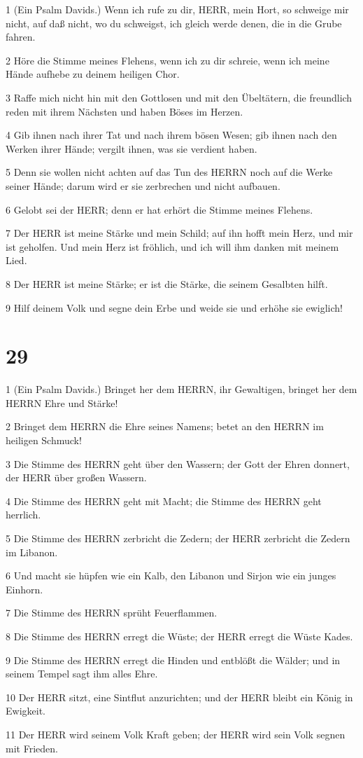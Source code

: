 \par 1 (Ein Psalm Davids.) Wenn ich rufe zu dir, HERR, mein Hort, so schweige mir nicht, auf daß nicht, wo du schweigst, ich gleich werde denen, die in die Grube fahren.
\par 2 Höre die Stimme meines Flehens, wenn ich zu dir schreie, wenn ich meine Hände aufhebe zu deinem heiligen Chor.
\par 3 Raffe mich nicht hin mit den Gottlosen und mit den Übeltätern, die freundlich reden mit ihrem Nächsten und haben Böses im Herzen.
\par 4 Gib ihnen nach ihrer Tat und nach ihrem bösen Wesen; gib ihnen nach den Werken ihrer Hände; vergilt ihnen, was sie verdient haben.
\par 5 Denn sie wollen nicht achten auf das Tun des HERRN noch auf die Werke seiner Hände; darum wird er sie zerbrechen und nicht aufbauen.
\par 6 Gelobt sei der HERR; denn er hat erhört die Stimme meines Flehens.
\par 7 Der HERR ist meine Stärke und mein Schild; auf ihn hofft mein Herz, und mir ist geholfen. Und mein Herz ist fröhlich, und ich will ihm danken mit meinem Lied.
\par 8 Der HERR ist meine Stärke; er ist die Stärke, die seinem Gesalbten hilft.
\par 9 Hilf deinem Volk und segne dein Erbe und weide sie und erhöhe sie ewiglich!

\chapter{29}

\par 1 (Ein Psalm Davids.) Bringet her dem HERRN, ihr Gewaltigen, bringet her dem HERRN Ehre und Stärke!
\par 2 Bringet dem HERRN die Ehre seines Namens; betet an den HERRN im heiligen Schmuck!
\par 3 Die Stimme des HERRN geht über den Wassern; der Gott der Ehren donnert, der HERR über großen Wassern.
\par 4 Die Stimme des HERRN geht mit Macht; die Stimme des HERRN geht herrlich.
\par 5 Die Stimme des HERRN zerbricht die Zedern; der HERR zerbricht die Zedern im Libanon.
\par 6 Und macht sie hüpfen wie ein Kalb, den Libanon und Sirjon wie ein junges Einhorn.
\par 7 Die Stimme des HERRN sprüht Feuerflammen.
\par 8 Die Stimme des HERRN erregt die Wüste; der HERR erregt die Wüste Kades.
\par 9 Die Stimme des HERRN erregt die Hinden und entblößt die Wälder; und in seinem Tempel sagt ihm alles Ehre.
\par 10 Der HERR sitzt, eine Sintflut anzurichten; und der HERR bleibt ein König in Ewigkeit.
\par 11 Der HERR wird seinem Volk Kraft geben; der HERR wird sein Volk segnen mit Frieden.

